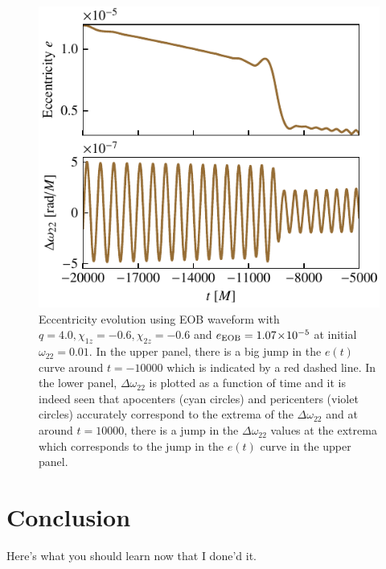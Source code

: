 \documentclass[aps,prd,amsmath,floats,floatfix, twocolumn,
superscriptaddress,nofootinbib,showpacs]{revtex4-1}
\newcommand{\into}{\!\times\!\relax} %
\newcommand{\eEOB}{e_{\text{EOB}}}
\newcommand{\resOmega}{\Delta \omega_{22}}
\begin{document}
\begin{figure}[thb]
  \centering
  \includegraphics[width=\columnwidth]{res_amp_glitches}
  \caption{Eccentricity evolution using EOB waveform with $q=4.0,
\chi_{1z}=-0.6, \chi_{2z}=-0.6$ and $\eEOB=1.07 \into 10^{-5}$ at
initial $\omega_{22} = 0.01$. In the upper panel, there is a big jump
in the $e(t)$ curve around $t=-10000$ which is indicated by a red
dashed line. In the lower panel, $\resOmega$ is plotted as a function
of time and it is indeed seen that apocenters (cyan circles) and
pericenters (violet circles) accurately correspond to the extrema of
the $\resOmega$ and at around $t=10000$, there is a jump in the
$\resOmega$ values at the extrema which corresponds to the jump in the
$e(t)$ curve in the upper panel.}
  \label{fig:res-amp-glitches}
\end{figure}

\section{Conclusion}
\label{sec:conclusion}
Here's what you should learn now that I done'd it.
\end{document}
